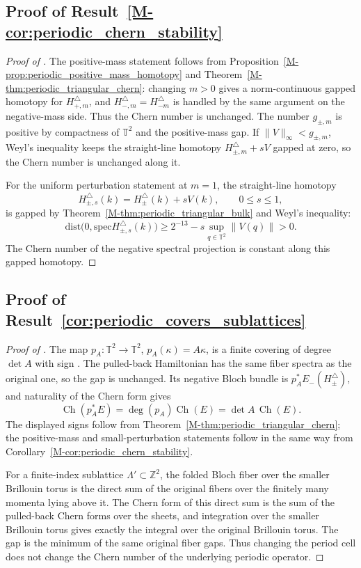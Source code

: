 \documentclass[11pt]{article}
\numberwithin{equation}{section}
\theoremstyle{definition}
\theoremstyle{remark}
\newcommand{\spec}{\mathrm{spec}}
\newcommand{\dist}{\mathrm{dist}}
\newcommand{\opnorm}[1]{\left\lVert#1\right\rVert}
\newcommand{\Ch}{\operatorname{Ch}}
\begin{document}
\subsection{Proof of Result~\ref{M-cor:periodic_chern_stability}}\label{app:proof:cor:periodic_chern_stability}
\begin{proof}[Proof of ]
The positive-mass statement follows from Proposition~\ref{M-prop:periodic_positive_mass_homotopy}
and Theorem~\ref{M-thm:periodic_triangular_chern}: changing \(m>0\) gives a norm-continuous gapped
homotopy for \(H_{+,m}^\triangle\), and \(H_{-,m}^\triangle=H_{-m}^\triangle\) is handled by the
same argument on the negative-mass side. Thus the Chern number is unchanged. The number
\(g_{\pm,m}\) is positive by compactness of \(\mathbb T^2\) and the positive-mass gap. If
\(\|V\|_\infty<g_{\pm,m}\), Weyl's inequality keeps the straight-line homotopy
\(H_{\pm,m}^\triangle+sV\) gapped at zero, so the Chern number is unchanged along it.

For the uniform perturbation statement at \(m=1\), the straight-line
homotopy
\[
H_{\pm,s}^\triangle(k)=H_\pm^\triangle(k)+sV(k),\qquad 0\le s\le1,
\]
is gapped by Theorem~\ref{M-thm:periodic_triangular_bulk} and Weyl's inequality:
\[
\dist\bigl(0,\spec H_{\pm,s}^\triangle(k)\bigr)
\ge
2^{-13}-s\sup_{q\in\mathbb T^2}\opnorm{V(q)}>0 .
\]
The Chern number of the negative spectral projection is constant along this gapped homotopy.
\end{proof}

\subsection{Proof of Result~\ref{cor:periodic_covers_sublattices}}\label{app:proof:cor:periodic_covers_sublattices}
\begin{proof}[Proof of ]
The map \(p_A:\mathbb T^2\to\mathbb T^2\), \(p_A(\kappa)=A\kappa\), is a finite covering of degree
\(\det A\) with sign \cite{Hatcher}. The pulled-back Hamiltonian has the same fiber spectra as the original one,
so the gap is unchanged. Its negative Bloch bundle is \(p_A^*E_-(H_\pm^\triangle)\), and naturality
of the Chern form gives
\[
\Ch(p_A^*E)=\deg(p_A)\Ch(E)=\det A\,\Ch(E).
\]
The displayed signs follow from Theorem~\ref{M-thm:periodic_triangular_chern}; the positive-mass and
small-perturbation statements follow in the same way from
Corollary~\ref{M-cor:periodic_chern_stability}.

For a finite-index sublattice \(\Lambda'\subset\mathbb Z^2\), the folded Bloch fiber over the
smaller Brillouin torus is the direct sum of the original fibers over the finitely many momenta
lying above it. The Chern form of this direct sum is the sum of the pulled-back Chern forms over
the sheets, and integration over the smaller Brillouin torus gives exactly the integral over the
original Brillouin torus. The gap is the minimum of the same original fiber gaps. Thus changing the
period cell does not change the Chern number of the underlying periodic operator.
\end{proof}
\end{document}
